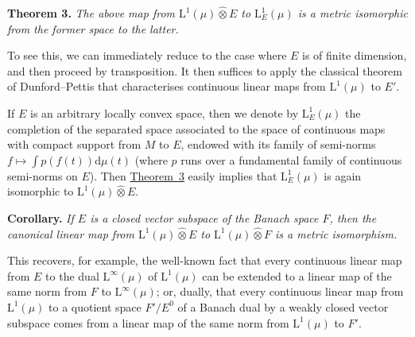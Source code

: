 \documentclass{article}
\theoremstyle{plain}
\newenvironment{itenv}[1]
  {\phantomsection\par\medskip\noindent\textbf{#1.}\itshape}
  {\medskip}
\newcommand{\LL}{\mathrm{L}}
\newcommand{\hotimes}{\widehat{\otimes}}
\newcommand{\dd}{\mathrm{d}}
\newcommand{\oldpage}[1]{\marginpar{\footnotesize$\Big\vert$ \textit{p.~#1}}}
\begin{document}
\begin{itenv}{Theorem 3}
\label{1.theorem3}
  The above map from $\LL^1(\mu)\hotimes E$ to $\LL_E^1(\mu)$ is a metric isomorphic from the former space to the latter.
\end{itenv}

To see this, we can immediately reduce to the case where $E$ is of finite dimension, and then proceed by transposition.
It then suffices to apply the classical theorem of Dunford--Pettis that characterises continuous linear maps from $\LL^1(\mu)$ to $E'$.

If $E$ is an arbitrary locally convex space, then we denote by $\LL_E^1(\mu)$ the completion of the separated space associated to the space of continuous maps with compact support from $M$ to $E$, endowed with its family of semi-norms $f\mapsto\int p(f(t))\dd\mu(t)$ (where $p$ runs over a fundamental family of continuous semi-norms on $E$).
Then \hyperref[1.theorem3]{Theorem~3} easily implies that $\LL_E^1(\mu)$ is again isomorphic to $\LL^1(\mu)\hotimes E$.

\begin{itenv}{Corollary}
  If $E$ is a closed vector subspace of the Banach space $F$, then the canonical linear map from $\LL^1(\mu)\hotimes E$ to $\LL^1(\mu)\hotimes F$ is a metric isomorphism.
\end{itenv}

\oldpage{80}
This recovers, for example, the well-known fact that every continuous linear map from $E$ to the dual $\LL^\infty(\mu)$ of $\LL^1(\mu)$ can be extended to a linear map of the same norm from $F$ to $\LL^\infty(\mu)$;
or, dually, that every continuous linear map from $\LL^1(\mu)$ to a quotient space $F'/E^0$ of a Banach dual by a weakly closed vector subspace comes from a linear map of the same norm from $\LL^1(\mu)$ to $F'$.
\end{document}
